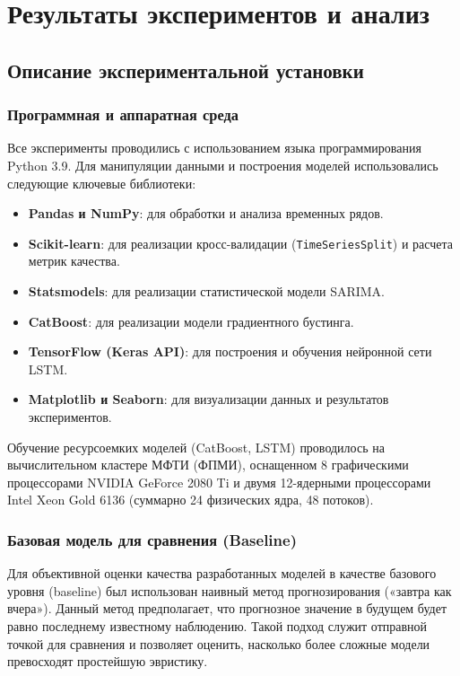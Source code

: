 \chapter{Результаты экспериментов и анализ}
\label{ch:results}

\section{Описание экспериментальной установки}
\label{sec:exp_setup}

\subsection{Программная и аппаратная среда}

\hspace*{1.25cm}Все эксперименты проводились с использованием языка программирования Python 3.9. Для манипуляции данными и построения моделей использовались следующие ключевые библиотеки:
\begin{itemize}
    \item \textbf{Pandas и NumPy}: для обработки и анализа временных рядов.
    \item \textbf{Scikit-learn}: для реализации кросс-валидации (\texttt{TimeSeriesSplit}) и расчета метрик качества.
    \item \textbf{Statsmodels}: для реализации статистической модели SARIMA.
    \item \textbf{CatBoost}: для реализации модели градиентного бустинга.
    \item \textbf{TensorFlow (Keras API)}: для построения и обучения нейронной сети LSTM.
    \item \textbf{Matplotlib и Seaborn}: для визуализации данных и результатов экспериментов.
\end{itemize}

\hspace*{1.25cm}Обучение ресурсоемких моделей (CatBoost, LSTM) проводилось на вычислительном кластере МФТИ (ФПМИ), оснащенном 8 графическими процессорами NVIDIA GeForce 2080 Ti и двумя 12-ядерными процессорами Intel Xeon Gold 6136 (суммарно 24 физических ядра, 48 потоков).

\subsection{Базовая модель для сравнения (Baseline)}

\hspace*{1.25cm}Для объективной оценки качества разработанных моделей в качестве базового уровня (baseline) был использован наивный метод прогнозирования («завтра как вчера»). Данный метод предполагает, что прогнозное значение в будущем будет равно последнему известному наблюдению. Такой подход служит отправной точкой для сравнения и позволяет оценить, насколько более сложные модели превосходят простейшую эвристику.

